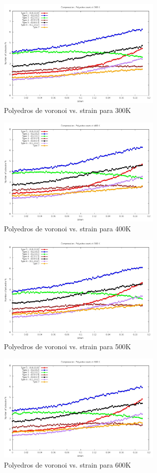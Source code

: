 \documentclass[10pt, oneside]{article} %
\begin{document}
\begin{figure}[H]
\centering
\includegraphics[width=8cm]{Figures/Compr_Polyedra_300K.jpeg}
\caption{Polyedros de voronoi vs. strain para 300K}
\end{figure}

\begin{figure}[H]
\centering
\includegraphics[width=8cm]{Figures/Compr_Polyedra_400K.jpeg}
\caption{Polyedros de voronoi vs. strain para 400K}
\end{figure}

\begin{figure}[H]
\centering
\includegraphics[width=8cm]{Figures/Compr_Polyedra_500K.jpeg}
\caption{Polyedros de voronoi vs. strain para 500K}
\end{figure}

\begin{figure}[H]
\centering
\includegraphics[width=8cm]{Figures/Compr_Polyedra_600K.jpeg}
\caption{Polyedros de voronoi vs. strain para 600K}
\end{figure}
\end{document}
